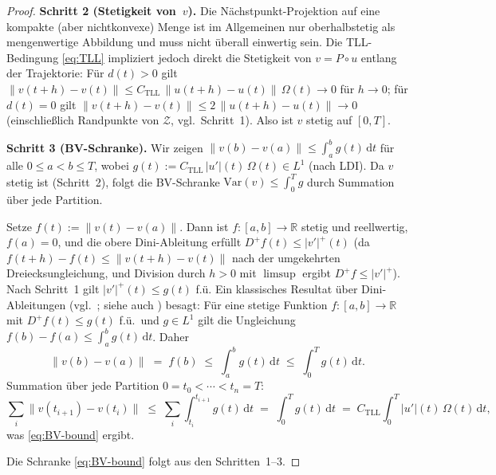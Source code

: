 \documentclass[12pt,a4paper]{article}
\theoremstyle{definition}
\theoremstyle{plain}
\theoremstyle{remark}
\newcommand{\Var}{\mathrm{Var}}
\begin{document}
\begin{proof}
\medskip
\noindent
\textbf{Schritt 2 (Stetigkeit von~$v$).}\;
Die Nächstpunkt-Projektion auf eine kompakte (aber nichtkonvexe)
Menge ist im Allgemeinen nur oberhalbstetig als mengenwertige
Abbildung und muss nicht überall einwertig sein.  Die
TLL-Bedingung \eqref{eq:TLL} impliziert jedoch direkt die Stetigkeit
von $v = P \circ u$ entlang der Trajektorie: Für $d(t) > 0$ gilt
$\|v(t+h) - v(t)\| \le C_{\mathrm{TLL}}\,\|u(t+h)-u(t)\|\,
\Omega(t) \to 0$ für $h \to 0$; für $d(t) = 0$ gilt
$\|v(t+h)-v(t)\| \le 2\,\|u(t+h)-u(t)\| \to 0$
(einschließlich Randpunkte von $\mathcal{Z}$, vgl.\ Schritt~1).
Also ist $v$ stetig auf $[0,T]$.

\medskip
\noindent
\textbf{Schritt 3 (BV-Schranke).}\;
Wir zeigen $\|v(b) - v(a)\| \le \int_a^b g(t)\,\mathrm{d}t$
für alle $0 \le a < b \le T$, wobei
$g(t) := C_{\mathrm{TLL}}\,|u'|(t)\,\Omega(t) \in L^1$
(nach LDI).  Da $v$ stetig ist (Schritt~2), folgt die
BV-Schranke $\Var(v) \le \int_0^T g$ durch Summation über
jede Partition.

Setze $f(t) := \|v(t) - v(a)\|$.  Dann ist $f: [a,b] \to \mathbb{R}$
stetig und reellwertig,
$f(a) = 0$, und die obere Dini-Ableitung erfüllt
$D^+ f(t) \le |v'|^+(t)$ (da
$f(t+h) - f(t) \le \|v(t+h)-v(t)\|$ nach der umgekehrten
Dreiecksungleichung, und Division durch $h > 0$ mit
$\limsup$ ergibt $D^+ f \le |v'|^+$).
Nach Schritt~1 gilt $|v'|^+(t) \le g(t)$ f.ü.  Ein klassisches Resultat über Dini-Ableitungen
(vgl.\ \cite[Kapitel~VII, \S\S\,9--10]{Saks1937}; siehe
auch \cite[Kapitel~3]{AmbrosioFuscoPallara2000}) besagt:
Für eine stetige Funktion $f:[a,b] \to \mathbb{R}$ mit
$D^+ f(t) \le g(t)$ f.ü.\ und $g \in L^1$ gilt die
Ungleichung $f(b) - f(a) \le \int_a^b g(t)\,\mathrm{d}t$.
Daher
\[
  \|v(b) - v(a)\| \;=\; f(b)
  \;\le\; \int_a^b g(t)\,\mathrm{d}t
  \;\le\; \int_0^T g(t)\,\mathrm{d}t.
\]
Summation über jede Partition $0 = t_0 < \cdots < t_n = T$:
\[
  \sum_i \|v(t_{i+1}) - v(t_i)\|
  \;\le\;
  \sum_i \int_{t_i}^{t_{i+1}} g(t)\,\mathrm{d}t
  \;=\;
  \int_0^T g(t)\,\mathrm{d}t
  \;=\;
  C_{\mathrm{TLL}} \int_0^T |u'|(t)\,\Omega(t)\,\mathrm{d}t,
\]
was \eqref{eq:BV-bound} ergibt.

\medskip
\noindent
Die Schranke \eqref{eq:BV-bound} folgt aus den Schritten~1--3.
\end{proof}
\end{document}

